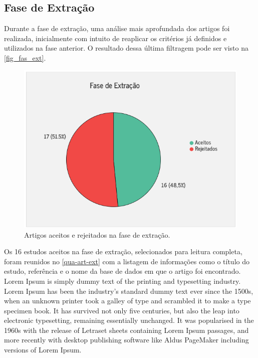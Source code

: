 \newpage{}

\subsection{Fase de Extração}

Durante a fase de extração, uma análise mais aprofundada dos artigos foi realizada, inicialmente com intuito de reaplicar os critérios já definidos e utilizados na fase anterior. O resultado dessa última filtragem pode ser visto na \autoref{fig_fas_ext}.

\begin{figure}[htb]
	\caption{\label{fig_fas_ext}Artigos aceitos e rejeitados na fase de extração.}
	\begin{center}
	    \includegraphics[scale=0.85]{Imagens/msl/fase_extracao_artigos.png}
	\end{center}
\end{figure}

Os 16 estudos aceitos na fase de extração, selecionados para leitura completa, foram reunidos no \autoref{qua-art-ext} com a listagem de informações como o título do estudo, referência e o nome da base de dados em que o artigo foi encontrado. Lorem Ipsum is simply dummy text of the printing and typesetting industry. Lorem Ipsum has been the industry's standard dummy text ever since the 1500s, when an unknown printer took a galley of type and scrambled it to make a type specimen book. It has survived not only five centuries, but also the leap into electronic typesetting, remaining essentially unchanged. It was popularised in the 1960s with the release of Letraset sheets containing Lorem Ipsum passages, and more recently with desktop publishing software like Aldus PageMaker including versions of Lorem Ipsum.

